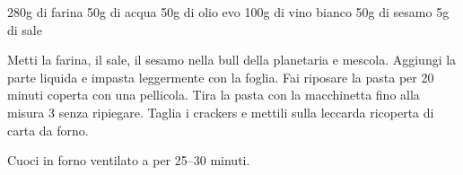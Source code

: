 \begin{ingreds}
	280g di farina
	50g di acqua
	50g di olio evo 
	100g di vino bianco
	50g di sesamo
	5g di sale
\end{ingreds}

\begin{method}
	Metti la farina, il sale, il sesamo nella bull della planetaria e mescola. Aggiungi la parte liquida e impasta leggermente con la foglia. Fai riposare la pasta per 20 minuti coperta con una pellicola.
	Tira la pasta con la macchinetta fino alla misura 3 senza ripiegare. Taglia i crackers e mettili sulla leccarda ricoperta di carta da forno.

	Cuoci in forno ventilato a  per 25--30 minuti.
\end {method}

